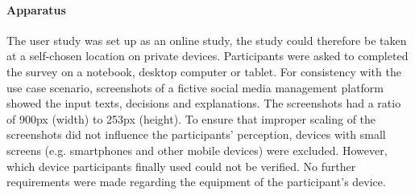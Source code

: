 \paragraph{Apparatus}
The user study was set up as an online study, the study could therefore be taken at a self-chosen location on private devices. Participants were asked to completed the survey on a notebook, desktop computer or tablet. For consistency with the use case scenario, screenshots of a fictive social media management platform showed the input texts, decisions and explanations. The screenshots had a ratio of 900px (width) to 253px (height). To ensure that improper scaling of the screenshots did not influence the participants' perception, devices with small screens (e.g. smartphones and other mobile devices) were excluded. However, which device participants finally used could not be verified. No further requirements were made regarding the equipment of the participant's device.

